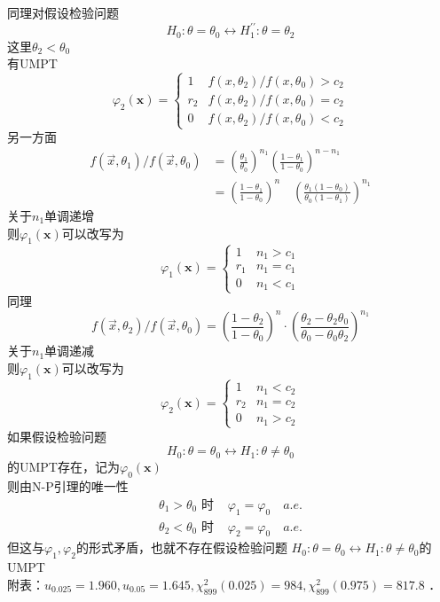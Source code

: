 \documentclass[UTF8]{ctexart}
\begin{document}
同理对假设检验问题
\[
H_0:\theta=\theta_0 \leftrightarrow H_1^{\prime \prime}:\theta=\theta_2
\]
这里$\theta_2<\theta_0$\\
有UMPT
\[
\varphi_2(\boldsymbol{x})= 
\begin{cases}
	1 & f\left(x, \theta_2\right) / f\left(x, \theta_0\right)>c_2 \\ 
	r_2 & f\left( x, \theta_2 \right) /f\left(x, \theta_0\right)=c_2 \\ 
	0 & f\left(x, \theta_2\right) / f\left(x, \theta_0\right) <c_2
\end{cases}
\]
另一方面
\[
\begin{aligned}
	 f(\vec{x},\theta_1)/f(\vec{x},\theta_0)&=\left(\frac{\theta_1}{\theta_0} \right)^{n_1} \left(\frac{1-\theta_1}{1-\theta_0}\right)^{n-n_1}\\
	 &=\left(\frac{1-\theta_1}{1-\theta_0}\right)^n \quad\left(\frac{\theta_1\left(1-\theta_0\right)}{\theta_0\left(1-\theta_{1}\right)}\right)^{n_1} 
\end{aligned}
\]
关于$n_1$单调递增\\
则$\varphi_1(\boldsymbol{x})$可以改写为
\[
\varphi_1(\boldsymbol{x})= \begin{cases}1 & n_1>c_1 \\ r_1 & n_1=c_1 \\ 0 & n_1<c_1\end{cases}
\]
同理
\[
f(\vec{x},\theta_2)/f(\vec{x},\theta_0)=\left(\frac{1-\theta_2}{1-\theta_0}\right)^n \cdot\left(\frac{\theta_2-\theta_2 \theta_0}{\theta_0-\theta_0 \theta_2}\right)^{n_1}
\]
关于$n_1$单调递减\\
则$\varphi_1(\boldsymbol{x})$可以改写为
\[
\varphi_2(\boldsymbol{x})= \begin{cases}1 & n_1<c_2 \\ r_2 & n_1=c_2 \\ 0 & n_1>c_2\end{cases}
\]
如果假设检验问题
\[
H_0: \theta=\theta_0 \leftrightarrow H_1: \theta \neq \theta_0
\]
的UMPT存在，记为$\varphi_0(\boldsymbol{x})$\\
则由N-P引理的唯一性\\
\[
\begin{array}{ll}
	\theta_1>\theta_0 \text { 时} & \varphi_1=\varphi_0 \quad a.e.\\
	\theta_2<\theta_0 \text { 时 } & \varphi_2=\varphi_0 \quad a.e.
\end{array}
\]
但这与$\varphi_1,\varphi_2$的形式矛盾，也就不存在假设检验问题 $H_0: \theta=\theta_0 \leftrightarrow H_1: \theta \neq \theta_0$的UMPT\\




\noindent 附表：$u_{0.025}=1.960, u_{0.05}=1.645, \chi_{899}^2(0.025)=984, \chi_{899}^2(0.975)=817.8$ ．
\end{document}
